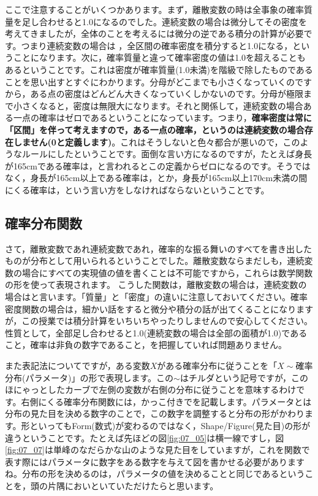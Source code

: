 \documentclass{ltjbook}
\begin{document}
ここで注意することがいくつかあります。まず，離散変数の時は全事象の確率質量を足し合わせると1.0になるのでした。連続変数の場合は微分してその密度を考えてきましたが，全体のことを考えるには微分の逆である積分の計算が必要です。つまり連続変数の場合は
，全区間の確率密度を積分すると1.0になる，ということになります。次に，確率質量と違って確率密度の値は1.0を超えることもあるということです。これは密度が確率質量(1.0未満)を階級で除したものであることを思い出すとすぐにわかります。分母がどこまでも小さくなっていくのですから，ある点の密度はどんどん大きくなっていくしかないのです。分母が極限まで小さくなると，密度は無限大になります。それと関係して，連続変数の場合ある一点の確率はゼロであるということになっています。つまり，\textbf{確率密度は常に「区間」を伴って考えますので，ある一点の確率，というのは連続変数の場合存在しません(0と定義します)}。これはそうしないと色々都合が悪いので，このようなルールにしたということです。面倒な言い方になるのですが，たとえば身長が165cmである確率は，と言われるとこの定義からゼロになるのです。そうではなく，身長が165cm以上である確率は，とか，身長が165cm以上170cm未満の間にくる確率は，という言い方をしなければならないということです。

\subsection{確率分布関数}
さて，離散変数であれ連続変数であれ，確率的な振る舞いのすべてを書き出したものが分布として用いられるということでした。離散変数ならまだしも，連続変数の場合にすべての実現値の値を書くことは不可能ですから，これらは数学関数の形を使って表現されます。
こうした関数は，離散変数の場合は，連続変数の場合はと言います。「質量」と「密度」の違いに注意しておいてください。確率密度関数の場合は，細かい話をすると微分や積分の話が出てくることになりますが，この授業では積分計算をいちいちやったりしませんので安心してください。性質として，全部足し合わせると1.0(連続変数の場合は全部の面積が1.0)であること，確率は非負の数字であること，を把握していれば問題ありません。

また表記法についてですが，ある変数$X$がある確率分布に従うことを「$X\sim$確率分布(パラメータ)」の形で表現します。この$\sim$はチルダという記号ですが，このほにゃっとしたカーブで左側の変数が右側の分布に従うことを意味するわけです。右側にくる確率分布関数には，かっこ付きでを記載します。パラメータとは分布の見た目を決める数字のことで，この数字を調整すると分布の形がかわります。形といってもForm(数式)が変わるのではなく，Shape/Figure(見た目)の形が違うということです。たとえば先ほどの図\ref{fig:07_05}は横一線ですし，図\ref{fig:07_07}は単峰のなだらかな山のような見た目をしていますが，これを関数で表す際にはパラメータに数字をある数字を与えて図を書かせる必要がありますね。分布の形を決めるのは，パラメータの値を決めることと同じであるということを，頭の片隅においといていただけたらと思います。
\end{document}
